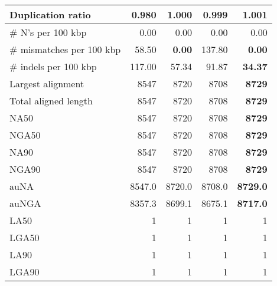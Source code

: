 \documentclass[12pt,a4paper]{article}
\begin{document}
\begin{table}[ht]
\begin{center}
\begin{tabular}{|l*{4}{|r}|}
Duplication ratio & {\bf 0.980} & 1.000 & 0.999 & 1.001 \\ \hline
\# N's per 100 kbp & 0.00 & 0.00 & 0.00 & 0.00 \\ \hline
\# mismatches per 100 kbp & 58.50 & {\bf 0.00} & 137.80 & {\bf 0.00} \\ \hline
\# indels per 100 kbp & 117.00 & 57.34 & 91.87 & {\bf 34.37} \\ \hline
Largest alignment & 8547 & 8720 & 8708 & {\bf 8729} \\ \hline
Total aligned length & 8547 & 8720 & 8708 & {\bf 8729} \\ \hline
NA50 & 8547 & 8720 & 8708 & {\bf 8729} \\ \hline
NGA50 & 8547 & 8720 & 8708 & {\bf 8729} \\ \hline
NA90 & 8547 & 8720 & 8708 & {\bf 8729} \\ \hline
NGA90 & 8547 & 8720 & 8708 & {\bf 8729} \\ \hline
auNA & 8547.0 & 8720.0 & 8708.0 & {\bf 8729.0} \\ \hline
auNGA & 8357.3 & 8699.1 & 8675.1 & {\bf 8717.0} \\ \hline
LA50 & 1 & 1 & 1 & 1 \\ \hline
LGA50 & 1 & 1 & 1 & 1 \\ \hline
LA90 & 1 & 1 & 1 & 1 \\ \hline
LGA90 & 1 & 1 & 1 & 1 \\ \hline
\end{tabular}
\end{center}
\end{table}
\end{document}
